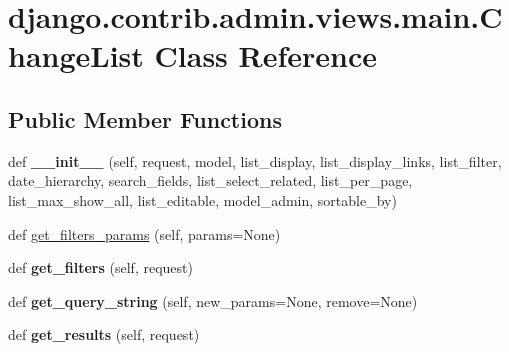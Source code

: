 \hypertarget{classdjango_1_1contrib_1_1admin_1_1views_1_1main_1_1_change_list}{}\section{django.\+contrib.\+admin.\+views.\+main.\+Change\+List Class Reference}
\label{classdjango_1_1contrib_1_1admin_1_1views_1_1main_1_1_change_list}
\subsection*{Public Member Functions}
\begin{DoxyCompactItemize}
\item 
\mbox{\label{classdjango_1_1contrib_1_1admin_1_1views_1_1main_1_1_change_list_a40cfb9762910c65e51fd995015350f57}} 
def {\bfseries \+\_\+\+\_\+init\+\_\+\+\_\+} (self, request, model, list\+\_\+display, list\+\_\+display\+\_\+links, list\+\_\+filter, date\+\_\+hierarchy, search\+\_\+fields, list\+\_\+select\+\_\+related, list\+\_\+per\+\_\+page, list\+\_\+max\+\_\+show\+\_\+all, list\+\_\+editable, model\+\_\+admin, sortable\+\_\+by)
\item 
def \mbox{\hyperlink{classdjango_1_1contrib_1_1admin_1_1views_1_1main_1_1_change_list_a5ad0e8e8f3ce8180660d3f37cdd4f3bf}{get\+\_\+filters\+\_\+params}} (self, params=None)
\item 
\mbox{\label{classdjango_1_1contrib_1_1admin_1_1views_1_1main_1_1_change_list_a3726d641fa0d3531655cf14ae59220b0}} 
def {\bfseries get\+\_\+filters} (self, request)
\item 
\mbox{\label{classdjango_1_1contrib_1_1admin_1_1views_1_1main_1_1_change_list_a653df59445f84968489101ddf3dd2a0a}} 
def {\bfseries get\+\_\+query\+\_\+string} (self, new\+\_\+params=None, remove=None)
\item 
\mbox{\label{classdjango_1_1contrib_1_1admin_1_1views_1_1main_1_1_change_list_a5529c0eb44b87ac64e27a052369b2191}} 
def {\bfseries get\+\_\+results} (self, request)
\item 

\end{DoxyCompactItemize}
